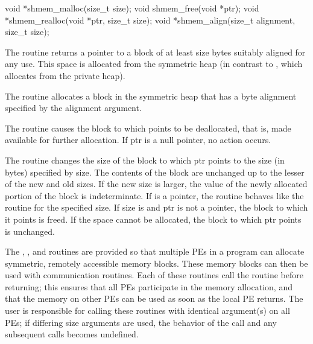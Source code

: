 \synC
void *shmem_malloc(size_t size);
void shmem_free(void *ptr);
void *shmem_realloc(void *ptr, size_t size);
void *shmem_align(size_t alignment, size_t size);%

{
       The  routine returns a pointer to a block of at least size
       bytes suitably aligned for any use.  This space is allocated from the
       symmetric heap (in contrast to , which allocates from the
       private heap).

       The  routine allocates a block in the symmetric heap that
       has a byte alignment specified by the alignment argument.

       The  routine causes the block to which  points to be
       deallocated, that is, made available for further allocation.  If ptr is
       a null pointer, no action occurs. 
              
       The  routine changes the size of the block to which ptr
       points to the size (in bytes) specified by size.  The contents of the
       block are unchanged up to the lesser of the new and old sizes. If the
       new size is larger, the value of the newly allocated portion of the
       block is indeterminate.  
       If  is a  pointer, the  routine behaves like the  routine for the specified size.  If size  is  and ptr is not a  pointer, the block to which it points is freed. If the space cannot be allocated, the block to which ptr points is unchanged.

       The , , and  routines are provided  so that multiple \ac{PE}s in a program can allocate symmetric, remotely
       accessible memory blocks.  These memory blocks can then be used with
       \openshmem communication routines.  Each of these routines call the
        routine before returning; this ensures that all
       \ac{PE}s participate in the memory allocation, and that the memory on other
       \ac{PE}s can be used	as  soon as the local \ac{PE} returns.  The user is
       responsible for calling these routines with identical argument(s) on
       all \ac{PE}s; if differing size arguments are used, the behavior of the call and any subsequent \openshmem calls becomes undefined.
}
